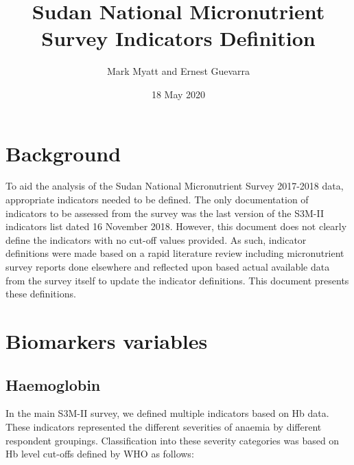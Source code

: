 \documentclass[12pt,a4paper]{article}
\title{Sudan National Micronutrient Survey Indicators Definition}
\author{Mark Myatt and Ernest Guevarra}
\date{18 May 2020}
\begin{document}
\maketitle

{
\hypersetup{linkcolor=}
\setcounter{tocdepth}{3}
\tableofcontents
}
\newpage

\hypertarget{background}{%
\section{Background}\label{background}}

To aid the analysis of the Sudan National Micronutrient Survey 2017-2018 data, appropriate indicators needed to be defined. The only documentation of indicators to be assessed from the survey was the last version of the S3M-II indicators list dated 16 November 2018. However, this document does not clearly define the indicators with no cut-off values provided. As such, indicator definitions were made based on a rapid literature review including micronutrient survey reports done elsewhere and reflected upon based actual available data from the survey itself to update the indicator definitions. This document presents these definitions.

\hypertarget{biomarkers-variables}{%
\section{Biomarkers variables}\label{biomarkers-variables}}

\hypertarget{haemoglobin}{%
\subsection{Haemoglobin}\label{haemoglobin}}

In the main S3M-II survey, we defined multiple indicators based on Hb data. These indicators represented the different severities of anaemia by different respondent groupings. Classification into these severity categories was based on Hb level cut-offs defined by WHO \citep{WorldHealthOrganization:2007tx, WorldHealthOrganization:2011ut} as follows:
\end{document}

